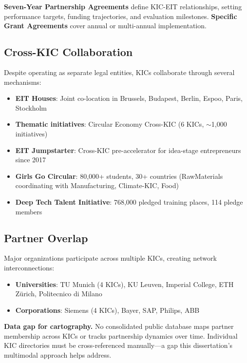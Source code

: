 \documentclass[../main.tex]{subfiles}
\begin{document}
\textbf{Seven-Year Partnership Agreements} define KIC-EIT relationships, setting performance targets, funding trajectories, and evaluation milestones. \textbf{Specific Grant Agreements} cover annual or multi-annual implementation.

\subsection*{Cross-KIC Collaboration}

Despite operating as separate legal entities, KICs collaborate through several mechanisms:

\begin{itemize}[leftmargin=*, itemsep=0.2em]
\item \textbf{EIT Houses}: Joint co-location in Brussels, Budapest, Berlin, Espoo, Paris, Stockholm
\item \textbf{Thematic initiatives}: Circular Economy Cross-KIC (6 KICs, $\sim$1,000 initiatives)
\item \textbf{EIT Jumpstarter}: Cross-KIC pre-accelerator for idea-stage entrepreneurs since 2017
\item \textbf{Girls Go Circular}: 80,000+ students, 30+ countries (RawMaterials coordinating with Manufacturing, Climate-KIC, Food)
\item \textbf{Deep Tech Talent Initiative}: 768,000 pledged training places, 114 pledge members
\end{itemize}

\subsection*{Partner Overlap}

Major organizations participate across multiple KICs, creating network interconnections:

\begin{itemize}[leftmargin=*, itemsep=0.1em]
\item \textbf{Universities}: TU Munich (4 KICs), KU Leuven, Imperial College, ETH Zürich, Politecnico di Milano
\item \textbf{Corporations}: Siemens (4 KICs), Bayer, SAP, Philips, ABB
\end{itemize}

\begin{importantbox}
\textbf{Data gap for cartography.} No consolidated public database maps partner membership across KICs or tracks partnership dynamics over time. Individual KIC directories must be cross-referenced manually---a gap this dissertation's multimodal approach helps address.
\end{importantbox}
\end{document}
